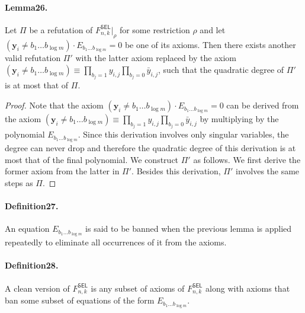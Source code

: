 \paragraph{Lemma26.} Let $\Pi$ be a refutation of $F^{\mathsf{SEL}}_{n,k}|_{\rho}$ for some restriction $\rho$ and let $(\mathbf y_i\neq b_1\ldots b_{\log m})\cdot E_{b_1\ldots b_{\log m}}=0$ be one of its axioms. Then there exists another valid refutation $\Pi'$ with the latter axiom replaced by the axiom $(\mathbf y_i\neq b_1\ldots b_{\log m})\equiv\prod_{b_j=1}y_{i,j}\prod_{b_j=0}\bar y_{i,j}$, such that the quadratic degree of $\Pi'$ is at most that of $\Pi$.
\begin{proof}
Note that the axiom $(\mathbf y_i\neq b_1\ldots b_{\log m})\cdot E_{b_1\ldots b_{\log m}}=0$ can be derived from the axiom $(\mathbf y_i\neq b_1\ldots b_{\log m})\equiv\prod_{b_j=1}y_{i,j}\prod_{b_j=0}\bar y_{i,j}$ by multiplying by the polynomial $E_{b_1\ldots b_{\log m}}$. Since this derivation involves only singular variables, the degree can never drop and therefore the quadratic degree of this derivation is at most that of the final polynomial. We construct $\Pi'$ as follows. We first derive the former axiom from the latter in $\Pi'$. Besides this derivation, $\Pi'$ involves the same steps as $\Pi$.
\end{proof}
\paragraph{Definition27.} An equation $E_{b_1\ldots b_{\log m}}$ is said to be banned when the previous lemma is applied repeatedly to eliminate all occurrences of it from the axioms.
\paragraph{Definition28.} A clean version of $F^{\mathsf{SEL}}_{n,k}$ is any subset of axioms of $F^{\mathsf{SEL}}_{n,k}$ along with axioms that ban some subset of equations of the form $E_{b_1\ldots b_{\log m}}$.
